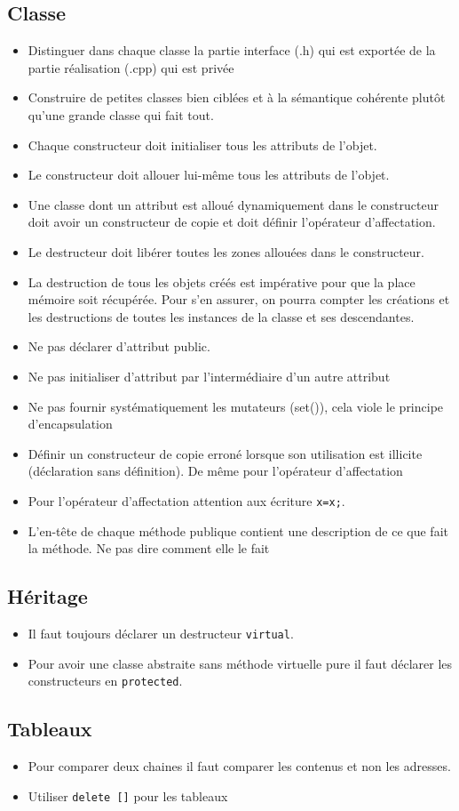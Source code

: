 \documentclass[10pt,a4paper,twoside]{article}
\begin{document}
\subsection{Classe}
\begin{itemize}
\item Distinguer dans chaque classe la partie interface (.h) qui est exportée de la partie réalisation (.cpp) qui est privée
\item Construire de petites classes bien ciblées et à la sémantique cohérente plutôt qu'une grande classe qui fait tout.
\item Chaque constructeur doit initialiser tous les attributs de l'objet.
\item Le constructeur doit allouer lui-même tous les attributs de l'objet.
\item Une classe dont un attribut est alloué dynamiquement dans le constructeur doit avoir un constructeur de copie et doit définir l'opérateur d'affectation.
\item Le destructeur doit libérer toutes les zones allouées dans le constructeur.
\item La destruction de tous les objets créés est impérative pour que la place mémoire soit récupérée. Pour s'en assurer, on pourra compter les créations et les destructions de toutes les instances de la classe et ses descendantes.
\item Ne pas déclarer d'attribut public.
\item Ne pas initialiser d'attribut par l'intermédiaire d'un autre attribut
\item Ne pas fournir systématiquement les mutateurs (set()), cela viole le principe d'encapsulation
\item Définir un constructeur de copie erroné lorsque son utilisation est illicite (déclaration sans définition). De même pour l'opérateur d'affectation
\item Pour l’opérateur d'affectation attention aux écriture \verb$x=x;$.
\item L'en-tête de chaque méthode publique contient une description de ce que fait la méthode. Ne pas dire comment elle le fait
\end{itemize}
\subsection{Héritage}
\begin{itemize}
\item Il faut toujours déclarer un destructeur \verb=virtual=.
\item Pour avoir une classe abstraite sans méthode virtuelle pure il faut déclarer les constructeurs en \verb=protected=.
\end{itemize}
\subsection{Tableaux}
\begin{itemize}
\item Pour comparer deux chaines il faut comparer les contenus et non les adresses.
\item Utiliser \verb=delete []= pour les tableaux
\end{itemize}
\end{document}
